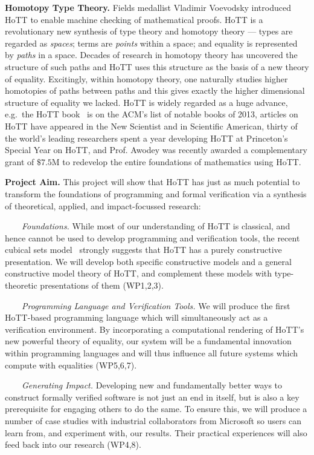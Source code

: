 \documentclass[a4paper,11pt]{article}
\newcommand{\eg}{{e.g.}\ }
\begin{document}
{\bf Homotopy Type Theory.} Fields medallist Vladimir Voevodsky
introduced HoTT to enable machine checking of mathematical proofs.
HoTT is a revolutionary new synthesis of type theory and homotopy
theory --- types are regarded as \emph{spaces}; terms are
\emph{points} within a space; and equality is represented by
\emph{paths} in a space. Decades of research in homotopy theory has
uncovered the structure of such paths and HoTT uses this structure as
the basis of a new theory of equality. Excitingly, within homotopy
theory, one naturally studies higher homotopies of paths between paths
and this gives exactly the higher dimensional structure of equality we
lacked.  HoTT is widely regarded as a huge advance, \eg the HoTT
book~\cite{hott-book} is on the ACM's list of notable books of 2013,
articles on HoTT have appeared in the New Scientist and in Scientific
American, thirty of the world's leading researchers spent a year
developing HoTT at Princeton's Special Year on HoTT, and Prof. Awodey
was recently awarded a complementary grant of $\$ 7.5$M to redevelop
the entire foundations of mathematics using HoTT.


{\bf Project Aim.}  This project will show that HoTT has just as much
potential to transform the foundations of programming and formal
verification via a synthesis of theoretical, applied, and
impact-focussed research:



$\;\;\; \;\;\;$ {\em Foundations.} 
While most of our understanding of HoTT is classical, and hence
cannot be used to develop programming and verification
tools, the recent cubical sets model~\cite{BezemM:cubsmt,nominal} 
strongly suggests that HoTT has a purely constructive
presentation. We will develop both specific constructive models and a
general constructive model theory of HoTT, and complement these models
with type-theoretic presentations of them (WP1,2,3).

$\;\;\;\;\;\;$ {\em Programming Language and Verification Tools.}  We
will produce the first HoTT-based programming language which will
simultaneously act as a verification environment. By incorporating a
computational rendering of HoTT's new powerful theory of equality, our system will
be a fundamental innovation within programming languages and will thus
influence all future systems which compute with equalities (WP5,6,7).

  $\;\;\;\;\;\;$ {\em Generating Impact.} Developing new and
  fundamentally better ways to construct formally verified software is
  not just an end in itself, but is also a key prerequisite 
  for engaging others to do the same.  To ensure this, we will produce
  a number of case studies with industrial collaborators from
  Microsoft so users can learn from, and experiment with, our
  results. Their practical experiences will also feed back into our
  research (WP4,8).
\end{document}

